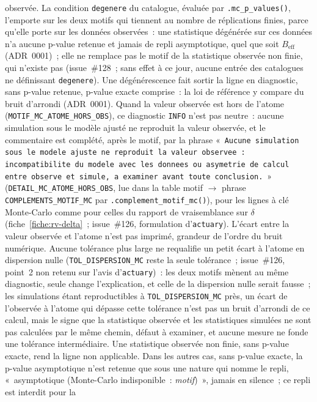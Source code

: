 \documentclass[a4paper,11pt]{article}
\newcommand{\code}[1]{\texttt{\small #1}}
\begin{document}
observée. La condition \code{degenere} du catalogue, évaluée par \code{.mc\_p\_values()},
l'emporte sur les deux motifs qui tiennent au nombre de réplications finies, parce qu'elle porte
sur les données observées~: une statistique dégénérée sur ces données n'a aucune p-value retenue
et jamais de repli asymptotique, quel que soit $B_{\text{eff}}$ (ADR~0001)~; elle ne remplace pas
le motif de la statistique observée non finie, qui n'existe pas (issue~\#128~; sans effet à ce
jour, aucune entrée des catalogues ne définissant \code{degenere}). Une dégénérescence fait
sortir la ligne en diagnostic, sans p-value retenue, p-value exacte comprise~: la loi de
référence y compare du bruit d'arrondi (ADR~0001). Quand la valeur observée est hors de l'atome
(\code{MOTIF\_MC\_ATOME\_HORS\_OBS}), ce diagnostic \code{INFO} n'est pas neutre~: aucune simulation
sous le modèle ajusté ne reproduit la valeur observée, et le commentaire est complété, après le
motif, par la phrase «~\code{Aucune simulation sous le modele ajuste ne reproduit la valeur
observee~: incompatibilite du modele avec les donnees ou asymetrie de calcul entre observe et
simule, a examiner avant toute conclusion.}~» (\code{DETAIL\_MC\_ATOME\_HORS\_OBS}, lue dans la
table motif $\to$ phrase \code{COMPLEMENTS\_MOTIF\_MC} par \code{.complement\_motif\_mc()}),
pour les lignes à clé Monte-Carlo comme pour celles du rapport de vraisemblance sur
$\delta$ (fiche~\ref{fiche:rv-delta}~; issue~\#126, formulation d'\code{actuary}). L'écart entre
la valeur observée et l'atome n'est pas imprimé, grandeur de l'ordre du bruit numérique. Aucune
tolérance plus large ne requalifie un petit écart à l'atome en dispersion nulle
(\code{TOL\_DISPERSION\_MC} reste la seule tolérance~; issue~\#126, point~2 non retenu sur l'avis
d'\code{actuary})~: les deux motifs mènent au même diagnostic, seule change l'explication, et
celle de la dispersion nulle serait fausse~; les simulations étant reproductibles à
\code{TOL\_DISPERSION\_MC} près, un écart de l'observée à l'atome qui dépasse cette tolérance
n'est pas un bruit d'arrondi de ce calcul, mais le signe que la statistique observée et les
statistiques simulées ne sont pas calculées par le même chemin, défaut à examiner, et aucune
mesure ne fonde une tolérance intermédiaire. Une statistique observée non finie, sans
p-value exacte, rend la ligne non applicable. Dans les autres cas, sans p-value exacte, la
p-value asymptotique n'est retenue que sous une nature qui nomme le repli, «~asymptotique
(Monte-Carlo indisponible~: \emph{motif})~», jamais en silence~; ce repli est interdit pour la
\end{document}

